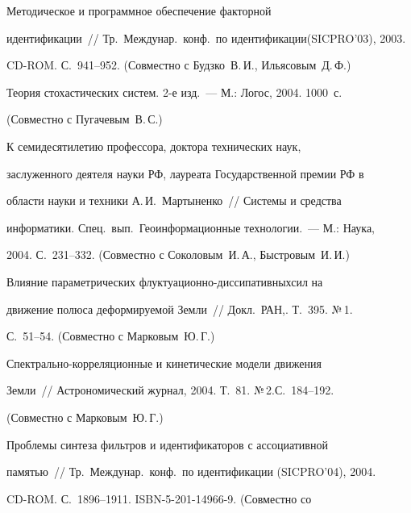  Методическое и программное обеспечение факторной


идентификации~// Тр.\ Междунар.\ конф.\ по идентификации\linebreak (SICPRO'03), 2003.


CD-ROM. С.~941--952. (Со\-вмест\-но с Будз\-ко~В.\,И., Ильясовым~Д.\,Ф.)










 Теория стохастических систем. 2-е изд.~--- М.: Логос, 2004. 1000~с.


(Совместно с Пугачевым~В.\,С.)





 К семидесятилетию профессора, доктора технических наук,


заслуженного деятеля науки РФ, лауреата Государственной премии РФ в


области науки и техники А.\,И.~Мартыненко~// Системы и средства


информатики. Спец.\ вып.\ Геоинформационные технологии.~--- М.: Наука,


2004. С.~231--332. (Совместно с Соколовым~И.\,А., Быстровым~И.\,И.)





 Влияние параметрических флуктуационно-диссипативных\linebreak сил на


движение полюса деформируемой Земли~// Докл.\ РАН,. Т.~395. №\,1.


С.~51--54. (Совместно с Марковым~Ю.\,Г.)





 Спектрально-корреляционные и кинетические модели движения


Земли~// Астрономический журнал, 2004. Т.~81. №\,2.\linebreak С.~184--192.


(Совместно с Марковым~Ю.\,Г.)





 Проблемы синтеза фильтров и идентификаторов с ассоциативной


памятью~// Тр.\ Междунар.\ конф.\ по идентификации (SICPRO'04), 2004.


 CD-ROM. С.~1896--1911. ISBN-5-201-14966-9. (Совместно со


